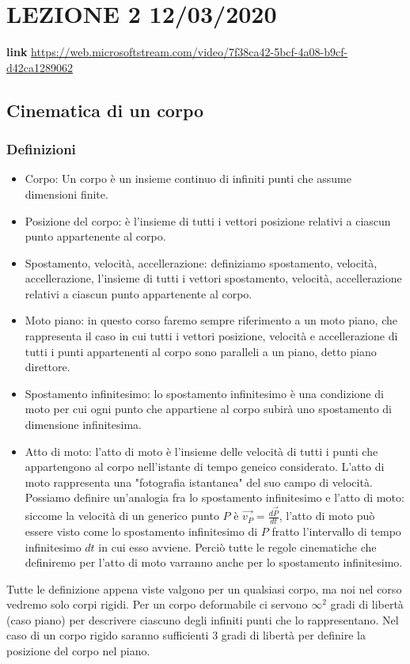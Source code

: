 \section{LEZIONE 2 12/03/2020}
\textbf{link} \url{https://web.microsoftstream.com/video/7f38ca42-5bcf-4a08-b9cf-d42ca1289062}
\subsection{Cinematica di un corpo}
\subsubsection{Definizioni}
\begin{itemize}
    \item Corpo: Un corpo è un insieme continuo di infiniti punti che assume dimensioni finite.
    \item Posizione del corpo: è l'insieme di tutti i vettori posizione relativi a ciascun punto appartenente al corpo.
    \item Spostamento, velocità, accellerazione: definiziamo spostamento, velocità, accellerazione, l'insieme di tutti i vettori spostamento, velocità, accellerazione relativi a ciascun punto appartenente al corpo.
    \item Moto piano: in questo corso faremo sempre riferimento a un moto piano, che rappresenta il caso in cui tutti i vettori posizione, velocità e accellerazione di tutti i punti appartenenti al corpo sono paralleli a un piano, detto piano direttore.
    \item Spostamento infinitesimo: lo spostamento infinitesimo è una condizione di moto per cui ogni punto che appartiene al corpo subirà uno spostamento di dimensione infinitesima.
    \item Atto di moto: l'atto di moto è l'insieme delle velocità di tutti i punti che appartengono al corpo nell'istante di tempo geneico considerato. L'atto di moto rappresenta una "fotografia istantanea" del suo campo di velocità. Possiamo definire un'analogia fra lo spostamento infinitesimo e l'atto di moto: siccome la velocità di un generico punto $P$ è $\vec{v_P} = \frac{d \vec{P}}{dt}$, l'atto di moto può essere visto come lo spostamento infinitesimo di $P$ fratto l'intervallo di tempo infinitesimo $dt$ in cui esso avviene. Perciò tutte le regole cinematiche che definiremo per l'atto di moto varranno anche per lo spostamento infinitesimo.
\end{itemize}
Tutte le definizione appena viste valgono per un qualsiasi corpo, ma noi nel corso vedremo solo corpi rigidi.\newline
Per un corpo deformabile ci servono $\infty^2$ gradi di libertà (caso piano) per descrivere ciascuno degli infiniti punti che lo rappresentano.\newline
Nel caso di un corpo rigido saranno sufficienti $3$ gradi di libertà per definire la posizione del corpo nel piano.

